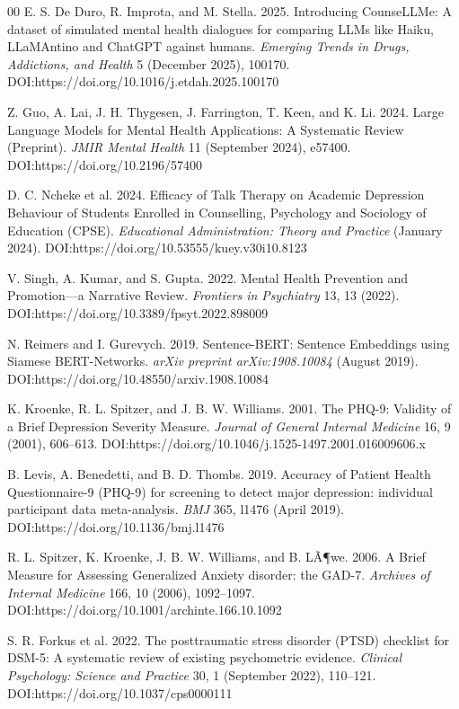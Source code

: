 ﻿\documentclass[acmsmall,screen]{acmart}
\begin{document}
\begin{thebibliography}{00}
 E. S. De Duro, R. Improta, and M. Stella. 2025. Introducing CounseLLMe: A dataset of simulated mental health dialogues for comparing LLMs like Haiku, LLaMAntino and ChatGPT against humans. \textit{Emerging Trends in Drugs, Addictions, and Health} 5 (December 2025), 100170. DOI:https://doi.org/10.1016/j.etdah.2025.100170

 Z. Guo, A. Lai, J. H. Thygesen, J. Farrington, T. Keen, and K. Li. 2024. Large Language Models for Mental Health Applications: A Systematic Review (Preprint). \textit{JMIR Mental Health} 11 (September 2024), e57400. DOI:https://doi.org/10.2196/57400

 D. C. Ncheke et al. 2024. Efficacy of Talk Therapy on Academic Depression Behaviour of Students Enrolled in Counselling, Psychology and Sociology of Education (CPSE). \textit{Educational Administration: Theory and Practice} (January 2024). DOI:https://doi.org/10.53555/kuey.v30i10.8123

 V. Singh, A. Kumar, and S. Gupta. 2022. Mental Health Prevention and Promotion---a Narrative Review. \textit{Frontiers in Psychiatry} 13, 13 (2022). DOI:https://doi.org/10.3389/fpsyt.2022.898009

 N. Reimers and I. Gurevych. 2019. Sentence-BERT: Sentence Embeddings using Siamese BERT-Networks. \textit{arXiv preprint arXiv:1908.10084} (August 2019). DOI:https://doi.org/10.48550/arxiv.1908.10084

 K. Kroenke, R. L. Spitzer, and J. B. W. Williams. 2001. The PHQ-9: Validity of a Brief Depression Severity Measure. \textit{Journal of General Internal Medicine} 16, 9 (2001), 606--613. DOI:https://doi.org/10.1046/j.1525-1497.2001.016009606.x

 B. Levis, A. Benedetti, and B. D. Thombs. 2019. Accuracy of Patient Health Questionnaire-9 (PHQ-9) for screening to detect major depression: individual participant data meta-analysis. \textit{BMJ} 365, l1476 (April 2019). DOI:https://doi.org/10.1136/bmj.l1476

 R. L. Spitzer, K. Kroenke, J. B. W. Williams, and B. LÃ¶we. 2006. A Brief Measure for Assessing Generalized Anxiety disorder: the GAD-7. \textit{Archives of Internal Medicine} 166, 10 (2006), 1092--1097. DOI:https://doi.org/10.1001/archinte.166.10.1092

 S. R. Forkus et al. 2022. The posttraumatic stress disorder (PTSD) checklist for DSM-5: A systematic review of existing psychometric evidence. \textit{Clinical Psychology: Science and Practice} 30, 1 (September 2022), 110--121. DOI:https://doi.org/10.1037/cps0000111


\end{thebibliography}
\end{document}
